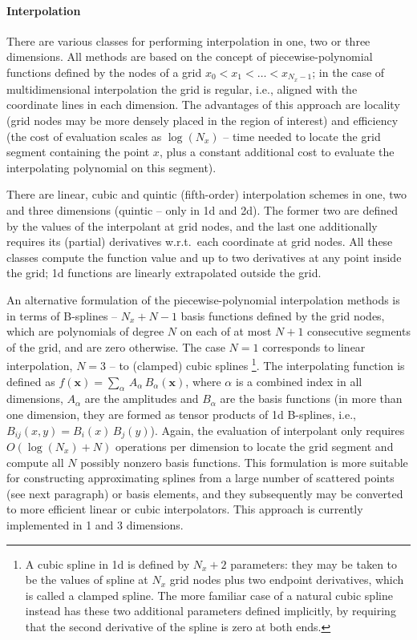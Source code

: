 \documentclass[12pt]{article}
\newcommand{\bx}{\boldsymbol{x}}
\begin{document}
\paragraph{Interpolation} \label{sec:SplineInterpolation}
There are various classes for performing interpolation in one, two or three dimensions.
All methods are based on the concept of piecewise-polynomial functions defined by the nodes of a grid $x_0<x_1<\dots<x_{N_x-1}$; in the case of multidimensional interpolation the grid is regular, i.e., aligned with the coordinate lines in each dimension. The advantages of this approach are locality (grid nodes may be more densely placed in the region of interest) and efficiency (the cost of evaluation scales as $\log(N_x)$ -- time needed to locate the grid segment containing the point $x$, plus a constant additional cost to evaluate the interpolating polynomial on this segment).

There are linear, cubic and quintic (fifth-order) interpolation schemes in one, two and three dimensions (quintic -- only in 1d and 2d). The former two are defined by the values of the interpolant at grid nodes, and the last one additionally requires its (partial) derivatives w.r.t.\ each coordinate at grid nodes. All these classes compute the function value and up to two derivatives at any point inside the grid; 1d functions are linearly extrapolated outside the grid.

An alternative formulation of the piecewise-polynomial interpolation methods is in terms of B-splines -- $N_x+N-1$ basis functions defined by the grid nodes, which are polynomials of degree $N$ on each of at most $N+1$ consecutive segments of the grid, and are zero otherwise. The case $N=1$ corresponds to linear interpolation, $N=3$ -- to (clamped) cubic splines%
\footnote{A cubic spline in 1d is defined by $N_x+2$ parameters: they may be taken to be the values of spline at $N_x$ grid nodes plus two endpoint derivatives, which is called a clamped spline. The more familiar case of a natural cubic spline instead has these two additional parameters defined implicitly, by requiring that the second derivative of the spline is zero at both ends.}.
The interpolating function is defined as $f(\bx) = \sum_\alpha\,A_\alpha\,B_\alpha(\bx)$, where $\alpha$ is a combined index in all dimensions, $A_\alpha$ are the amplitudes and $B_\alpha$ are the basis functions (in more than one dimension, they are formed as tensor products of 1d B-splines, i.e., $B_{ij}(x,y) = B_i(x)\,B_j(y)$). Again, the evaluation of interpolant only requires $O(\log(N_x)+N)$ operations per dimension to locate the grid segment and compute all $N$ possibly nonzero basis functions. This formulation is more suitable for constructing approximating splines from a large number of scattered points (see next paragraph) or basis elements, and they subsequently may be converted to more efficient linear or cubic interpolators. This approach is currently implemented in 1 and 3 dimensions.
\end{document}
